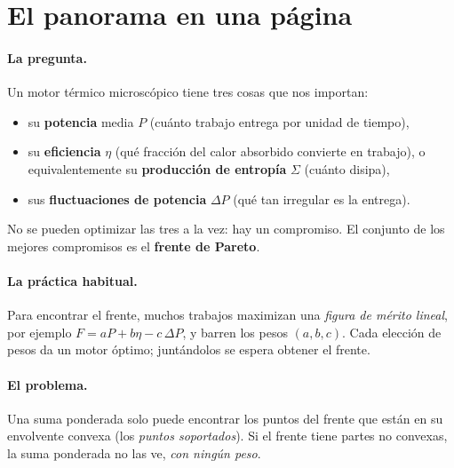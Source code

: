 \section{El panorama en una página}

\paragraph{La pregunta.} Un motor térmico microscópico tiene tres cosas que nos importan:
\begin{itemize}
\item su \textbf{potencia} media $P$ (cuánto trabajo entrega por unidad de tiempo),
\item su \textbf{eficiencia} $\eta$ (qué fracción del calor absorbido convierte en trabajo), o
  equivalentemente su \textbf{producción de entropía} $\Sigma$ (cuánto disipa),
\item sus \textbf{fluctuaciones de potencia} $\Delta P$ (qué tan irregular es la entrega).
\end{itemize}
No se pueden optimizar las tres a la vez: hay un compromiso. El conjunto de los mejores
compromisos es el \textbf{frente de Pareto}.

\paragraph{La práctica habitual.} Para encontrar el frente, muchos trabajos maximizan una
\emph{figura de mérito lineal}, por ejemplo $F = aP + b\eta - c\,\Delta P$, y barren los pesos
$(a,b,c)$. Cada elección de pesos da un motor óptimo; juntándolos se espera obtener el frente.

\paragraph{El problema.} Una suma ponderada solo puede encontrar los puntos del frente que están en
su envolvente convexa (los \emph{puntos soportados}). Si el frente tiene partes no convexas, la suma
ponderada no las ve, \emph{con ningún peso}.

